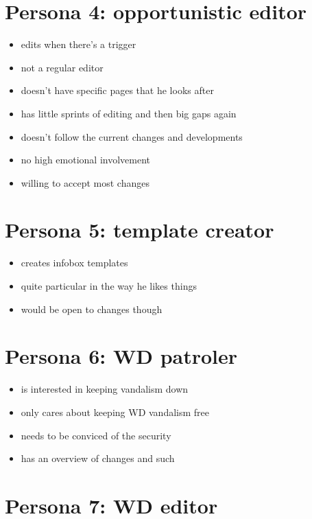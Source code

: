 \documentclass{article}
\begin{document}
\section{Persona 4: opportunistic editor}

\begin{itemize}
 \item edits when there's a trigger
 \item not a regular editor
 \item doesn't have specific pages that he looks after
 \item has little sprints of editing and then big gaps again
 \item doesn't follow the current changes and developments 
 \item no high emotional involvement
 \item willing to accept most changes
\end{itemize}

\begin{quote}
 
\end{quote}

\section{Persona 5: template creator}

\begin{itemize}
 \item creates infobox templates
 \item quite particular in the way he likes things
 \item would be open to changes though
\end{itemize}

\section{Persona 6: WD patroler}

\begin{itemize}
 \item is interested in keeping vandalism down
 \item only cares about keeping WD vandalism free
 \item needs to be conviced of the security
 \item has an overview of changes and such
\end{itemize}

\section{Persona 7: WD editor}
\end{document}
